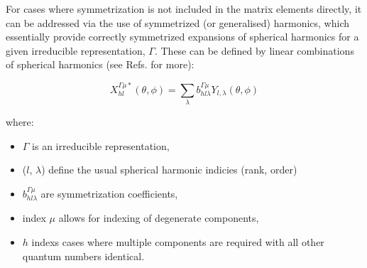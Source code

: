 \documentclass[10pt]{article}
\begin{document}


For cases where symmetrization is not included in the matrix elements directly, it can be addressed via the use of symmetrized (or generalised) harmonics, which essentially provide correctly symmetrized expansions of spherical harmonics for a given irreducible representation, $\Gamma$. These can be defined by linear combinations of spherical harmonics (see Refs.\cite{Altmann1963a,Altmann1965,Chandra1987} for more):

\begin{equation}
X_{hl}^{\Gamma\mu*}(\theta,\phi)=\sum_{\lambda}b_{hl\lambda}^{\Gamma\mu}Y_{l,\lambda}(\theta,\phi)\label{eq:symm-harmonics}
\end{equation}


where: 

\begin{itemize}
\item $\Gamma$ is an irreducible representation, 
\item ($l$, $\lambda$) define the usual spherical harmonic indicies (rank, order)
\item $b_{hl\lambda}^{\Gamma\mu}$ are symmetrization coefficients, 
\item index $\mu$ allows for indexing of degenerate components,
\item $h$ indexs cases where multiple components are required with all other quantum numbers identical. 
\end{itemize}
    
\end{document}
